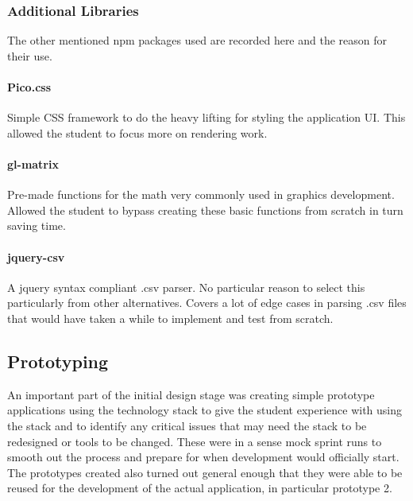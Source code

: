 \subsubsection{Additional Libraries}
The other mentioned npm packages used are recorded here and the reason for their use.

\paragraph{Pico.css}
Simple CSS framework to do the heavy lifting for styling the application UI. This allowed the student to focus more on rendering work.

\paragraph{gl-matrix}
Pre-made functions for the math very commonly used in graphics development. Allowed the student to bypass creating these basic functions from scratch in turn saving time.

\paragraph{jquery-csv}
A jquery syntax compliant .csv parser. No particular reason to select this particularly from other alternatives. Covers a lot of edge cases in parsing .csv files that would have taken a while to implement and test from scratch.

\subsection{Prototyping} \label{prototype}
An important part of the initial design stage was creating simple prototype applications using the technology stack to give the student experience with using the stack and to identify any critical issues that may need the stack to be redesigned or tools to be changed. These were in a sense mock sprint runs to smooth out the process and prepare for when development would officially start. The prototypes created also turned out general enough that they were able to be reused for the development of the actual application, in particular prototype 2.

